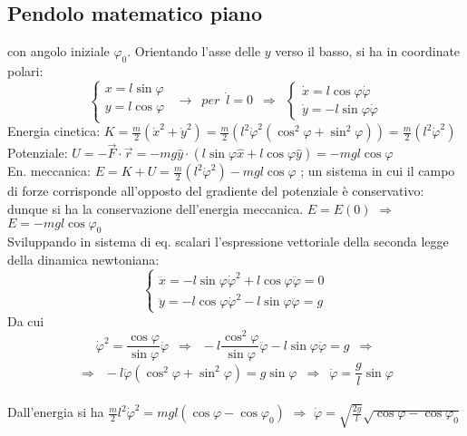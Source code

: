 \documentclass[10pt]{article}
\theoremstyle{plain}
\begin{document}
\subsection{Pendolo matematico piano}
con angolo iniziale $\varphi_0$. Orientando l'asse delle $y$ verso il basso, si ha in coordinate polari:
\[\begin{cases}
	x = l \sin \varphi \\
	y = l \cos \varphi \\
\end{cases} \enspace \rightarrow \enspace per \enspace \dot l = 0 \enspace \Rightarrow \enspace \begin{cases}
    \dot x = l \cos \varphi \dot \varphi \\
    \dot y = - l \sin \varphi \dot \varphi
\end{cases}\]
Energia cinetica: $\displaystyle K = \frac{m}{2}(\dot x^2 + \dot y^2) = \frac{m}{2}(l^2 \dot \varphi^2 (\cos^2 \varphi + \sin^2 \varphi)) = \frac{m}{2}(l^2 \dot \varphi^2)$
\\Potenziale: $\displaystyle U = - \Vec{F} \cdot \Vec{r} = - mg \hat{y} \cdot (l \sin \varphi \hat{x} + l \cos \varphi \hat{y}) = - mg l \cos \varphi$
\\En. meccanica: $\displaystyle E = K + U = \frac{m}{2}(l^2 \dot \varphi^2) - mg l \cos \varphi$ ; un sistema in cui il campo di forze corrisponde all'opposto del gradiente del potenziale è conservativo: dunque si ha la conservazione dell'energia meccanica. $E = E(0)$ $\Rightarrow$ $\displaystyle E = - mg l \cos \varphi_0$
\\Sviluppando in sistema di eq. scalari l'espressione vettoriale della seconda legge della dinamica newtoniana:
\[\begin{cases}
    \ddot x = - l \sin \varphi \dot \varphi^2 + l \cos \varphi \ddot \varphi = 0\\
    \ddot y = - l \cos \varphi \dot \varphi^2 - l \sin \varphi \ddot \varphi = g
\end{cases}\]
Da cui
\[\dot \varphi^2 = \frac{\cos \varphi}{\sin \varphi}\ddot \varphi \enspace \Rightarrow \enspace - l \frac{\cos^2 \varphi}{\sin \varphi} \ddot \varphi - l \sin \varphi \ddot \varphi = g \enspace \Rightarrow\]
\[\Rightarrow \enspace - l \ddot \varphi (\cos^2 \varphi + \sin^2 \varphi) = g \sin\varphi \enspace \Rightarrow \enspace \ddot \varphi = \frac{g}{l}\sin \varphi\]
\\Dall'energia si ha $\displaystyle \frac{m}{2}l^{2} \dot \varphi^2 = m g l (\cos \varphi - \cos \varphi_0)$ $\Rightarrow$ $\displaystyle \dot \varphi = \sqrt{\frac{2g}{l}}\sqrt{\cos \varphi - \cos \varphi_0}$
\end{document}
